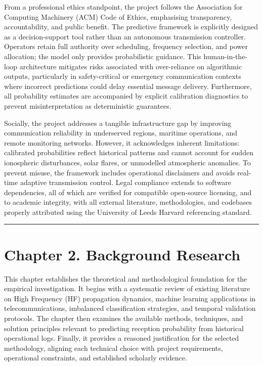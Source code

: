 From a professional ethics standpoint, the project follows the
Association for Computing Machinery (ACM) Code of Ethics, emphasising
transparency, accountability, and public benefit. The predictive
framework is explicitly designed as a decision-support tool rather than
an autonomous transmission controller. Operators retain full authority
over scheduling, frequency selection, and power allocation; the model
only provides probabilistic guidance. This human-in-the-loop
architecture mitigates risks associated with over-reliance on
algorithmic outputs, particularly in safety-critical or emergency
communication contexts where incorrect predictions could delay essential
message delivery. Furthermore, all probability estimates are accompanied
by explicit calibration diagnostics to prevent misinterpretation as
deterministic guarantees.

Socially, the project addresses a tangible infrastructure gap by
improving communication reliability in underserved regions, maritime
operations, and remote monitoring networks. However, it acknowledges
inherent limitations: calibrated probabilities reflect historical
patterns and cannot account for sudden ionospheric disturbances, solar
flares, or unmodelled atmospheric anomalies. To prevent misuse, the
framework includes operational disclaimers and avoids real-time adaptive
transmission control. Legal compliance extends to software dependencies,
all of which are verified for compatible open-source licensing, and to
academic integrity, with all external literature, methodologies, and
codebases properly attributed using the University of Leeds Harvard
referencing standard.

\begin{center}\rule{0.5\linewidth}{0.5pt}\end{center}

\section{Chapter 2. Background
Research}\label{chapter-2.-background-research}

This chapter establishes the theoretical and methodological foundation
for the empirical investigation. It begins with a systematic review of
existing literature on High Frequency (HF) propagation dynamics, machine
learning applications in telecommunications, imbalanced classification
strategies, and temporal validation protocols. The chapter then examines
the available methods, techniques, and solution principles relevant to
predicting reception probability from historical operational logs.
Finally, it provides a reasoned justification for the selected
methodology, aligning each technical choice with project requirements,
operational constraints, and established scholarly evidence.

